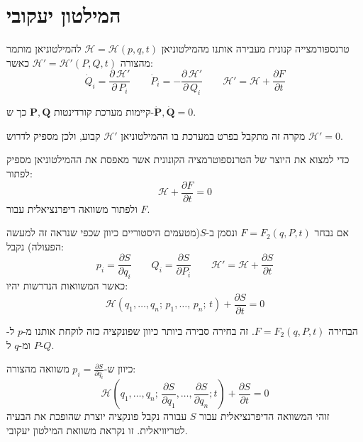 \documentclass{tstextbook}
\begin{document}
\section{המילטון יעקובי}

\begin{reminder}
טרנספורמצייה קנונית מעבירה אותנו מהמילטוניאן \(\mathcal{H}=\mathcal{H}(p,q,t)\) להמילטוניאן מותמר מהצורה \(\mathcal{\mathcal{H}}'=\mathcal{\mathcal{H}}'(P,Q,t)\) כאשר:
$${{\dot{Q}_{i}=\displaystyle\frac{\partial\,\mathcal{\mathcal{H}}'}{\partial\,P_{i}}}}\qquad  {{\dot{P}_{i}=-\displaystyle\frac{\partial\,\mathcal{\mathcal{H}}'}{\partial\,Q_{i}}}}\qquad \mathcal{\mathcal{H}}'=\mathcal{H}+\frac{\partial F}{\partial t}$$

\end{reminder}
\begin{proposition}
קיימות מערכת קורדינטות \(\mathbf{P},\mathbf{Q}\) כך ש-\(\dot{\mathbf{P}},\dot{\mathbf{Q}}=0\). 

\end{proposition}
\begin{remark}
מקרה זה מתקבל בפרט במערכת בו ההמילטוניאן \(\mathcal{H}'\) קבוע, ולכן מספיק לדרוש \(\mathcal{H}'=0\).

\end{remark}
\begin{proposition}
כדי למצוא את היוצר של הטרנספוטרמציה הקונונית אשר מאפסת את ההמילטוניאן מספיק לפתור:
$$\mathcal{H}+\frac{\partial F}{\partial t}=0$$
ולפתור משוואה דיפרנציאלית עבור \(F\). 

\end{proposition}
\begin{corollary}
אם נבחר \(F=F_{2}(q,P,t)\) ונסמן ב-\(S\)(מטעמים היסטוריים כיוון שכפי שנראה זה למעשה הפעולה) נקבל:
$${{p_{i}=\displaystyle\frac{\partial S}{\partial q_{i}}}}\qquad  {{Q_{i}=\displaystyle\frac{\partial S}{\partial P_{i}}}}\qquad {{\mathcal{\mathcal{H}}'=\mathcal{H}+\displaystyle\frac{\partial S}{\partial t}}}$$
כאשר המשוואות הנדרשות יהיו:
$$\mathcal{H}(q_{1},\ldots,q_{n};\,p_{1},\ldots,\,p_{n};\,t)+\frac{\partial S}{\partial t}=0$$

\end{corollary}
\begin{remark}
הבחירה \(F=F_{2}(q,P,t)\). זה בחירה סבירה ביותר כיוון שפונקציה כזה לוקחת אותנו מ-\(p\) ל-\(P\) ומ-\(q\) ל-\(Q\).

\end{remark}
\begin{corollary}
כיוון ש-\(p_{i}=\frac{\partial S}{\partial q_{i}}\) משוואה מהצורה:
$$\mathcal{H}(q_{1},\ldots,q_{n};\,\frac{\partial S}{\partial q_{1}},\ldots,\frac{\partial S}{\partial q_{n}};t)+\frac{\partial S}{\partial t}=0$$
זוהי המשוואה הדיפרנציאלית עבור \(S\) עבורה נקבל פונקציה יוצרת שהופכת את הבעיה לטריוויאלית. זו נקראת משוואת המילטון יעקובי.

\end{corollary}
\end{document}

